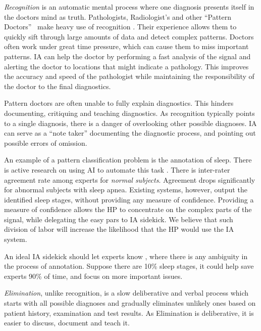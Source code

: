 \documentclass[11pt]{pnas-new}
\begin{document}
{\em Recognition} is an automatic mental process where one diagnosis
presents itself in the doctors mind as truth. Pathologists,
Radiologist's and other ``Pattern Doctors''~\cite{topol2019deep} make heavy use
of recognition . Their experience allows them to quickly sift through
large amounts of data and detect complex patterns.  Doctors 
often work under great time pressure, which can cause them to miss
important patterns. IA can help the doctor by performing a fast
analysis of the signal and alerting the doctor to locations that might
indicate a pathology. This improves the accuracy and speed of the
pathologist while maintaining the responsibility of the doctor to the
final diagnostics. 

Pattern doctors are often unable to fully explain  diagnostics.
This hinders documenting, critiquing and teaching diagnostics. As
recognition typically points to a single diagnosis, there is a danger
of overlooking other possible diagnoses. IA can serve as a ``note
taker'' documenting the diagnostic process, and pointing out possible
errors of omission. 

An example of a pattern classification problem is the annotation of
sleep. There is active research on using AI to automate this task
\cite{sleepHT2020}.
There is  inter-rater agreement rate among experts for 
{\em normal subjects}. Agreement drops significantly for abnormal subjects with  sleep apnea. 
Existing systems, however, output the identified sleep stages, 
without providing any measure of confidence. Providing a measure of confidence allows the HP to concentrate on the complex parts of the signal, while delegating the easy pars to IA sidekick. We believe that such division of labor will increase the likelihood that the HP would use the IA system.

An ideal IA
sidekick should let experts know , where there is any
ambiguity in the process of annotation. Suppose there are 10\%  sleep stages, it could help save experts 90\% of time, and
focus on more important issues.

{\em Elimination}, unlike recognition, is a slow deliberative and
verbal process which starts with all possible diagnoses and gradually
eliminates unlikely ones based on patient history, examination and
test results. As Elimination is deliberative, it is easier to discuss,
document and teach it.
\end{document}
